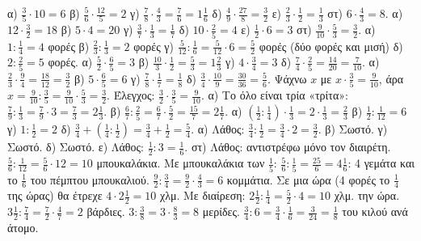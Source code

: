  α) $\frac{3}{5}\cdot 10=6$ \quad β) $\frac{5}{6}\cdot\frac{12}{5}=2$ \quad γ) $\frac{7}{8}\cdot\frac{4}{3}=\frac{7}{6}=1\frac{1}{6}$ \quad δ) $\frac{4}{9}\cdot\frac{27}{8}=\frac{3}{2}$ \quad ε) $\frac{2}{3}\cdot\frac{1}{2}=\frac{1}{3}$ \quad στ) $6\cdot\frac{4}{3}=8$.
 α) $12\cdot\frac{3}{2}=18$ \quad β) $5\cdot 4=20$ \quad γ) $\frac{3}{7}\cdot\frac{1}{3}=\frac{1}{7}$ \quad δ) $10\cdot\frac{2}{5}=4$ \quad ε) $\frac{1}{2}\cdot 6=3$ \quad στ) $\frac{9}{10}\cdot\frac{5}{3}=\frac{3}{2}$.
 α) $1:\frac{1}{4}=4$ φορές \quad β) $\frac{2}{3}:\frac{1}{3}=2$ φορές \quad γ) $\frac{5}{12}:\frac{1}{6}=\frac{5}{12}\cdot 6=\frac{5}{2}$ φορές (δύο φορές και μισή) \quad δ) $2:\frac{2}{5}=5$ φορές.
 α) $\frac{5}{2}\cdot\frac{6}{5}=3$ \quad β) $\frac{10}{3}\cdot\frac{1}{2}=\frac{5}{3}=1\frac{2}{3}$ \quad γ) $4\cdot\frac{3}{4}=3$ \quad δ) $\frac{7}{4}\cdot\frac{2}{5}=\frac{14}{20}=\frac{7}{10}$.
 α) $\frac{2}{3}\cdot\frac{9}{4}=\frac{18}{12}=\frac{3}{2}$ \quad β) $5\cdot\frac{6}{5}=6$ \quad γ) $\frac{7}{8}\cdot\frac{1}{7}=\frac{1}{8}$ \quad δ) $\frac{3}{4}\cdot\frac{10}{9}=\frac{30}{36}=\frac{5}{6}$.
 Ψάχνω $x$ με $x\cdot\frac{3}{5}=\frac{9}{10}$, άρα $x=\frac{9}{10}:\frac{3}{5}=\frac{9}{10}\cdot\frac{5}{3}=\frac{3}{2}$. Έλεγχος: $\frac{3}{2}\cdot\frac{3}{5}=\frac{9}{10}$.
 α) Το όλο είναι τρία «τρίτα»: $\frac{7}{9}:\frac{1}{3}=\frac{7}{9}\cdot 3=\frac{7}{3}=2\frac{1}{3}$. β) $\frac{6}{7}:\frac{2}{5}=\frac{6}{7}\cdot\frac{5}{2}=\frac{15}{7}=2\frac{1}{7}$.
 α) $\left(\frac{1}{2}:\frac{1}{4}\right)\cdot\frac{1}{3}=2\cdot\frac{1}{3}=\frac{2}{3}$ \quad β) $\frac{1}{2}:\frac{1}{12}=6$ \quad γ) $1:\frac{1}{2}=2$ \quad δ) $\frac{3}{4}+\left(\frac{1}{4}:\frac{1}{2}\right)=\frac{3}{4}+\frac{1}{2}=\frac{5}{4}$.
 α) Λάθος: $\frac{3}{4}:\frac{1}{2}=\frac{3}{4}\cdot 2=\frac{3}{2}$. β) Σωστό. γ) Σωστό. δ) Σωστό. ε) Λάθος: $\frac{1}{2}:3=\frac{1}{6}$. στ) Λάθος: αντιστρέφω μόνο τον διαιρέτη.
 $\frac{5}{6}:\frac{1}{12}=\frac{5}{6}\cdot 12=10$ μπουκαλάκια. Με μπουκαλάκια των $\frac{1}{5}$: $\frac{5}{6}:\frac{1}{5}=\frac{25}{6}=4\frac{1}{6}$: 4 γεμάτα και το $\frac{1}{6}$ του πέμπτου μπουκαλιού.
 $\frac{9}{2}:\frac{3}{4}=\frac{9}{2}\cdot\frac{4}{3}=6$ κομμάτια.
 Σε μια ώρα (4 φορές το $\frac{1}{4}$ της ώρας) θα έτρεχε $4\cdot 2\frac{1}{2}=10$ χλμ. Με διαίρεση: $2\frac{1}{2}:\frac{1}{4}=\frac{5}{2}\cdot 4=10$ χλμ. την ώρα.
 $3\frac{1}{2}:\frac{7}{4}=\frac{7}{2}\cdot\frac{4}{7}=2$ βάρδιες.
 $3:\frac{3}{8}=3\cdot\frac{8}{3}=8$ μερίδες.
 $\frac{3}{4}:6=\frac{3}{4}\cdot\frac{1}{6}=\frac{3}{24}=\frac{1}{8}$ του κιλού ανά άτομο.
